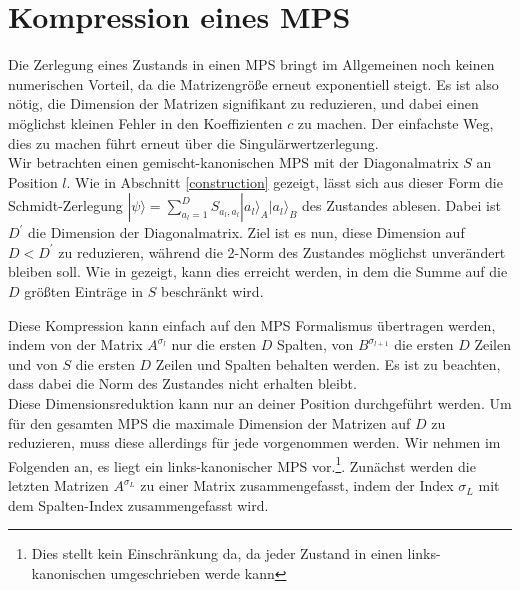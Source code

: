 \documentclass[10pt,a4paper]{report}
\begin{document}
\section{Kompression eines MPS}\label{compress}
Die Zerlegung eines Zustands in einen MPS bringt im Allgemeinen noch keinen numerischen Vorteil, da die Matrizengröße erneut exponentiell steigt. Es ist also nötig, die Dimension der Matrizen signifikant zu reduzieren, und dabei einen möglichst kleinen Fehler in den Koeffizienten $c$ zu machen. Der einfachste Weg, dies zu machen führt erneut über die Singulärwertzerlegung.\\


Wir betrachten einen gemischt-kanonischen MPS mit der Diagonalmatrix $S$ an Position $l$. Wie in Abschnitt \ref{construction} gezeigt, lässt sich aus dieser Form die Schmidt-Zerlegung $|\psi\rangle=\sum_{a_l=1}^D S_{a_l,a_l}|a_l\rangle_A|a_l\rangle_B$ des Zustandes ablesen. Dabei ist $D^\prime$ die Dimension der Diagonalmatrix. Ziel ist es nun, diese Dimension auf $D<D^\prime$ zu reduzieren, während die 2-Norm des Zustandes möglichst unverändert bleiben soll. Wie in  gezeigt, kann dies erreicht werden, in dem die Summe auf die $D$ größten Einträge in $S$ beschränkt wird. 

Diese Kompression kann einfach auf den MPS Formalismus übertragen werden, indem von der Matrix $A^{\sigma_l}$ nur die ersten $D$ Spalten, von $B^{\sigma_{l+1}}$ die ersten $D$ Zeilen und von $S$ die ersten $D$ Zeilen und Spalten behalten werden. Es ist zu beachten, dass dabei die Norm des Zustandes nicht erhalten bleibt.\\

Diese Dimensionsreduktion kann nur an deiner Position durchgeführt werden. Um für den gesamten MPS die maximale Dimension der Matrizen auf $D$ zu reduzieren, muss diese allerdings für jede vorgenommen werden. Wir nehmen im Folgenden an, es liegt ein links-kanonischer MPS vor.\footnote{Dies stellt kein Einschränkung da, da jeder Zustand in einen links-kanonischen umgeschrieben werde kann}. Zunächst werden die letzten Matrizen $A^{\sigma_L}$ zu einer Matrix zusammengefasst, indem der Index $\sigma_L$ mit dem Spalten-Index zusammengefasst wird.
\end{document}
